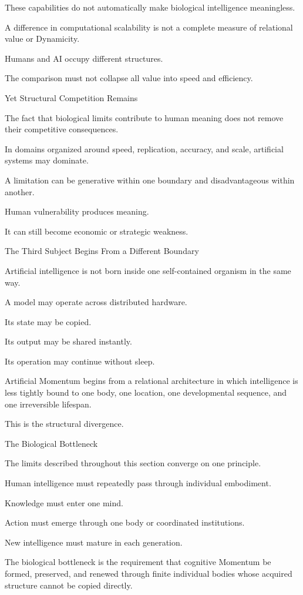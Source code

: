 These capabilities do not automatically make biological intelligence meaningless.

A difference in computational scalability is not a complete measure of relational value or Dynamicity.

Humans and AI occupy different structures.

The comparison must not collapse all value into speed and efficiency.

Yet Structural Competition Remains

The fact that biological limits contribute to human meaning does not remove their competitive consequences.

In domains organized around speed, replication, accuracy, and scale, artificial systems may dominate.

A limitation can be generative within one boundary and disadvantageous within another.

Human vulnerability produces meaning.

It can still become economic or strategic weakness.

The Third Subject Begins From a Different Boundary

Artificial intelligence is not born inside one self-contained organism in the same way.

A model may operate across distributed hardware.

Its state may be copied.

Its output may be shared instantly.

Its operation may continue without sleep.

Artificial Momentum begins from a relational architecture in which intelligence is less tightly bound to one body, one location, one developmental sequence, and one irreversible lifespan.

This is the structural divergence.

The Biological Bottleneck

The limits described throughout this section converge on one principle.

Human intelligence must repeatedly pass through individual embodiment.

Knowledge must enter one mind.

Action must emerge through one body or coordinated institutions.

New intelligence must mature in each generation.

The biological bottleneck is the requirement that cognitive Momentum be formed, preserved, and renewed through finite individual bodies whose acquired structure cannot be copied directly.


